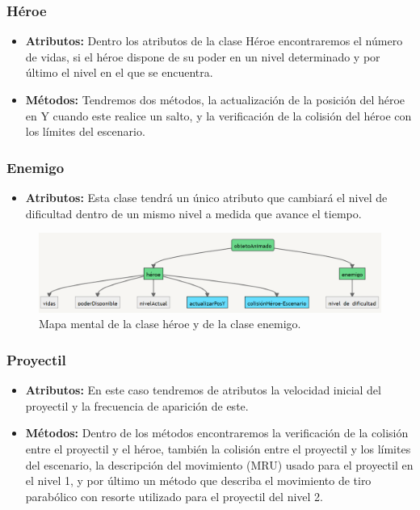 \documentclass{article}
\begin{document}
    \subsubsection{Héroe}
    \begin{itemize}
        \item \textbf{Atributos:} Dentro los atributos de la clase Héroe encontraremos el número de vidas, si el héroe dispone de su poder en un nivel determinado y por último el nivel en el que se encuentra.
        \item \textbf{Métodos:} Tendremos dos métodos, la actualización de la posición del héroe en Y cuando este realice un salto, y la verificación de la colisión del héroe con los límites del escenario.
    \end{itemize}
    
    \subsubsection{Enemigo}
    \begin{itemize}
        \item \textbf{Atributos:} Esta clase tendrá un único atributo que cambiará el nivel de dificultad dentro de un mismo nivel a medida que avance el tiempo.
    \end{itemize}
    
\begin{figure}[h]
\includegraphics[scale=0.6]{Images/Heroe-enemigo.png}
\centering
\caption{Mapa mental de la clase héroe y de la clase enemigo.}
\label{fig:func1}
\end{figure}
    
    \subsubsection{Proyectil}
    \begin{itemize}
        \item \textbf{Atributos:} En este caso tendremos de atributos la velocidad inicial del  proyectil y la frecuencia de aparición de este.
        \item \textbf{Métodos:} Dentro de los métodos encontraremos la verificación de la colisión entre el proyectil y el héroe, también la colisión entre el proyectil y los límites del escenario, la descripción del movimiento (MRU) usado para el proyectil en el nivel 1, y por último un método que describa el movimiento de tiro parabólico con resorte utilizado para el proyectil del nivel 2.
    \end{itemize}
    
\end{document}
